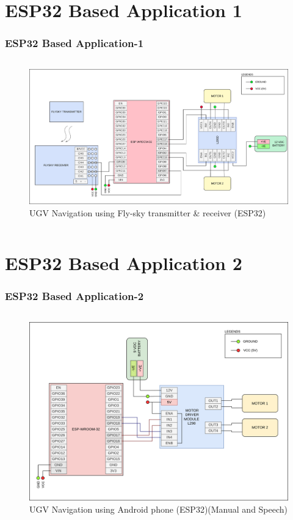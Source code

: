 \documentclass[xcolor=table]{beamer}
\begin{document}
\section{ESP32 Based Application 1}
\begin{frame}
\frametitle{ESP32 Based Application-1}
\begin{columns}
	\begin{figure}[h!]
  		\centering
  		\includegraphics[width=\linewidth]{./figs/Wiring_UGV_flysky.png}
  		\caption{UGV Navigation using Fly-sky transmitter \& receiver (ESP32)}
  		\label{Wiring_UGV_flysky}
	\end{figure}
\end{columns}
\end{frame}

\section{ESP32 Based Application 2}
\begin{frame}
\frametitle{ESP32 Based Application-2}
\begin{columns}
	\begin{figure}[h!]
  		\centering
  		\includegraphics[width=\linewidth]{./figs/Wiring_UGV_speech.png}
  		\caption{UGV Navigation using Android phone (ESP32)(Manual and Speech)}
  		\label{Wiring_UGV_speech}
	\end{figure}
\end{columns}
\end{frame}
\end{document}
